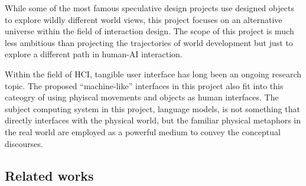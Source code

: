 \documentclass[12pt]{article}
\begin{document}
\begin{description}
    While some of the most famous speculative design projects use designed objects to explore wildly different world views, this project focuses on an alternative universe within the field of interaction design. The scope of this project is much less ambitious than projecting the trajectories of world development but just to explore a different path in human-AI interaction.
    \item[Tangible user interface] Within the field of HCI, tangible user interface has long been an ongoing research topic. The proposed ``machine-like'' interfaces in this project also fit into this cateogry of using phyiscal movements and objects as human interfaces. The subject computing system in this project, language models, is not something that directly interfaces with the physical world, but the familiar physical metaphors in the real world are employed as a powerful medium to convey the conceptual discourses. 
\end{description}
\subsection{Related works}




\printbibliography[heading=bibintoc]
\end{document}
